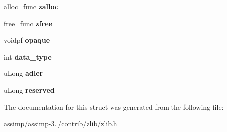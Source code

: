 \begin{DoxyCompactItemize}
\item 
\hypertarget{structz__stream__s_a23a2299c384f808e76e9908f21216b0f}{alloc\+\_\+func {\bfseries zalloc}}\label{structz__stream__s_a23a2299c384f808e76e9908f21216b0f}

\item 
\hypertarget{structz__stream__s_a89eb750ade7f4f0b56bfdadf13344982}{free\+\_\+func {\bfseries zfree}}\label{structz__stream__s_a89eb750ade7f4f0b56bfdadf13344982}

\item 
\hypertarget{structz__stream__s_ab72467f908d2ce65d5b42ee6556ef8bb}{voidpf {\bfseries opaque}}\label{structz__stream__s_ab72467f908d2ce65d5b42ee6556ef8bb}

\item 
\hypertarget{structz__stream__s_a9d8f63877d7639a8bca60f9fc3704fc4}{int {\bfseries data\+\_\+type}}\label{structz__stream__s_a9d8f63877d7639a8bca60f9fc3704fc4}

\item 
\hypertarget{structz__stream__s_ade2217fe31e671be1257731883201223}{u\+Long {\bfseries adler}}\label{structz__stream__s_ade2217fe31e671be1257731883201223}

\item 
\hypertarget{structz__stream__s_add73791dd19b49c9c68f3f3d328c37db}{u\+Long {\bfseries reserved}}\label{structz__stream__s_add73791dd19b49c9c68f3f3d328c37db}

\end{DoxyCompactItemize}


The documentation for this struct was generated from the following file\+:\begin{DoxyCompactItemize}
\item 
assimp/assimp-\/3../contrib/zlib/zlib.\+h\end{DoxyCompactItemize}
